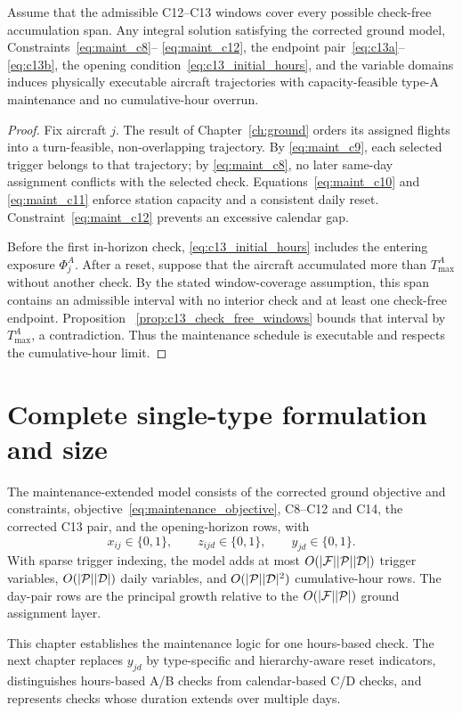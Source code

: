 \begin{theorem}
    \label{thm:maintenance_layer_feasibility}
    Assume that the admissible C12--C13 windows cover every possible
    check-free accumulation span. Any integral solution satisfying the
    corrected ground model, Constraints~\eqref{eq:maint_c8}--
    \eqref{eq:maint_c12}, the endpoint pair~\eqref{eq:c13a}--
    \eqref{eq:c13b}, the opening condition~\eqref{eq:c13_initial_hours}, and
    the variable domains induces physically executable aircraft trajectories
    with capacity-feasible type-A maintenance and no cumulative-hour overrun.
\end{theorem}
\begin{proof}
    Fix aircraft $j$. The result of Chapter~\ref{ch:ground} orders its assigned
    flights into a turn-feasible, non-overlapping trajectory. By
    \eqref{eq:maint_c9}, each selected trigger belongs to that trajectory; by
    \eqref{eq:maint_c8}, no later same-day assignment conflicts with the
    selected check. Equations~\eqref{eq:maint_c10} and
    \eqref{eq:maint_c11} enforce station capacity and a consistent daily reset.
    Constraint~\eqref{eq:maint_c12} prevents an excessive calendar gap.

    Before the first in-horizon check, \eqref{eq:c13_initial_hours} includes
    the entering exposure $\Phi_j^A$. After a reset, suppose that the aircraft
    accumulated more than $T_{\max}^{A}$ without another check. By the stated
    window-coverage assumption, this span contains an admissible interval with
    no interior check and at least one check-free endpoint. Proposition~
    \ref{prop:c13_check_free_windows} bounds that interval by
    $T_{\max}^{A}$, a contradiction. Thus the maintenance schedule is
    executable and respects the cumulative-hour limit.
\end{proof}

\section{Complete single-type formulation and size}

The maintenance-extended model consists of the corrected ground objective and
constraints, objective~\eqref{eq:maintenance_objective}, C8--C12 and C14,
the corrected C13 pair, and the opening-horizon rows, with
\begin{equation}
    x_{ij}\in\{0,1\},\qquad
    z_{ijd}\in\{0,1\},\qquad
    y_{jd}\in\{0,1\}.
    \label{eq:maintenance_integrality}
\end{equation}
With sparse trigger indexing, the model adds at most
$O(|\mathcal{F}||\mathcal{P}||\mathcal{D}|)$ trigger variables, $O(|\mathcal{P}||\mathcal{D}|)$ daily variables, and
$O(|\mathcal{P}||\mathcal{D}|^2)$ cumulative-hour rows. The day-pair rows are the principal
growth relative to the $O(|\mathcal{F}||\mathcal{P}|)$ ground assignment layer.

This chapter establishes the maintenance logic for one hours-based check. The
next chapter replaces $y_{jd}$ by type-specific and hierarchy-aware reset
indicators, distinguishes hours-based A/B checks from calendar-based C/D
checks, and represents checks whose duration extends over multiple days.
